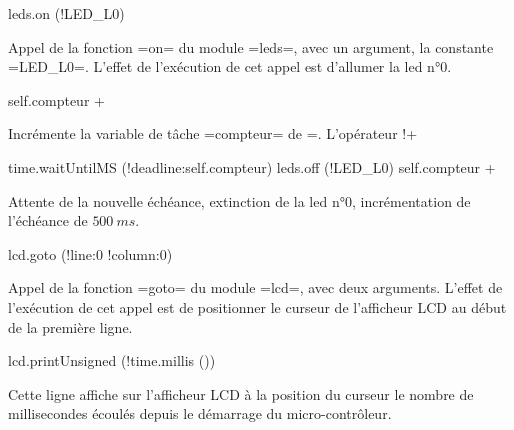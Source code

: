 \begin{PLM}[8]
    leds.on (!LED_L0)
\end{PLM}

Appel de la fonction \plm=on= du module \plm=leds=, avec un argument, la constante \plm=LED_L0=. L'effet de l'exécution de cet appel est d'allumer la led n°0.



\begin{PLM}[9]
    self.compteur +%
\end{PLM}

Incrémente la variable de tâche \plm=compteur= de =. L'opérateur \plm!+%


\begin{PLM}[10]
    time.waitUntilMS (!deadline:self.compteur)
    leds.off (!LED_L0)
    self.compteur +%
\end{PLM}

Attente de la nouvelle échéance, extinction de la led n°0, incrémentation de l'échéance de $500~ms$.


\begin{PLM}[13]
    lcd.goto (!line:0 !column:0)
\end{PLM}

Appel de la fonction \plm=goto= du module \plm=lcd=, avec deux arguments. L'effet de l'exécution de cet appel est de positionner le curseur de l'afficheur LCD au début de la première ligne.




\begin{PLM}[14]
    lcd.printUnsigned (!time.millis ())
\end{PLM}

Cette ligne affiche sur l'afficheur LCD à la position du curseur le nombre de millisecondes écoulés depuis le démarrage du micro-contrôleur.





